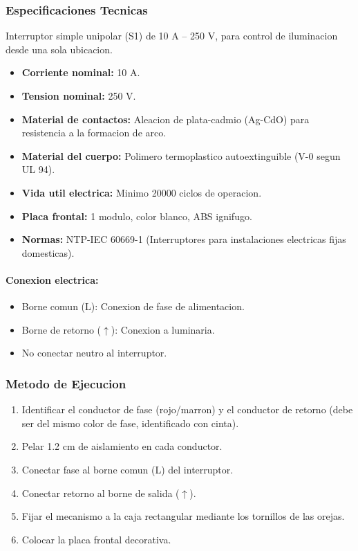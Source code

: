 \subsubsection{Especificaciones Tecnicas}

Interruptor simple unipolar (S1) de 10 A -- 250 V, para control de iluminacion desde una sola ubicacion.

\begin{itemize}[nosep]
  \item \textbf{Corriente nominal:} 10 A.
  \item \textbf{Tension nominal:} 250 V.
  \item \textbf{Material de contactos:} Aleacion de plata-cadmio (Ag-CdO) para resistencia a la formacion de arco.
  \item \textbf{Material del cuerpo:} Polimero termoplastico autoextinguible (V-0 segun UL 94).
  \item \textbf{Vida util electrica:} Minimo 20000 ciclos de operacion.
  \item \textbf{Placa frontal:} 1 modulo, color blanco, ABS ignifugo.
  \item \textbf{Normas:} NTP-IEC 60669-1 (Interruptores para instalaciones electricas fijas domesticas).
\end{itemize}

\paragraph{Conexion electrica:}
\begin{itemize}[nosep]
  \item Borne comun (L): Conexion de fase de alimentacion.
  \item Borne de retorno ($\uparrow$): Conexion a luminaria.
  \item No conectar neutro al interruptor.
\end{itemize}

\subsubsection{Metodo de Ejecucion}

\begin{enumerate}
  \item Identificar el conductor de fase (rojo/marron) y el conductor de retorno (debe ser del mismo color de fase, identificado con cinta).
  \item Pelar 1.2 cm de aislamiento en cada conductor.
  \item Conectar fase al borne comun (L) del interruptor.
  \item Conectar retorno al borne de salida ($\uparrow$).
  \item Fijar el mecanismo a la caja rectangular mediante los tornillos de las orejas.
  \item Colocar la placa frontal decorativa.
\end{enumerate}

